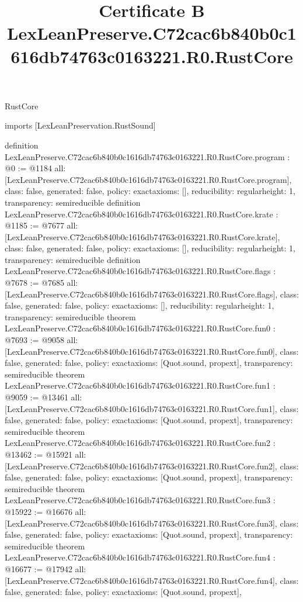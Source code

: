 \begin{lexlean}{RustCore}
\title{Certificate B LexLeanPreserve.C72cac6b840b0c1616db74763c0163221.R0.RustCore}
\begin{coremodule}
imports [LexLeanPreservation.RustSound]

definition LexLeanPreserve.C72cac6b840b0c1616db74763c0163221.R0.RustCore.program : @0 := @1184 {
  all: [LexLeanPreserve.C72cac6b840b0c1616db74763c0163221.R0.RustCore.program],
  class: false,
  generated: false,
  policy: exact{axioms: []},
  reducibility: regular{height: 1},
  transparency: semireducible
}
definition LexLeanPreserve.C72cac6b840b0c1616db74763c0163221.R0.RustCore.krate : @1185 := @7677 {
  all: [LexLeanPreserve.C72cac6b840b0c1616db74763c0163221.R0.RustCore.krate],
  class: false,
  generated: false,
  policy: exact{axioms: []},
  reducibility: regular{height: 1},
  transparency: semireducible
}
definition LexLeanPreserve.C72cac6b840b0c1616db74763c0163221.R0.RustCore.flags : @7678 := @7685 {
  all: [LexLeanPreserve.C72cac6b840b0c1616db74763c0163221.R0.RustCore.flags],
  class: false,
  generated: false,
  policy: exact{axioms: []},
  reducibility: regular{height: 1},
  transparency: semireducible
}
theorem LexLeanPreserve.C72cac6b840b0c1616db74763c0163221.R0.RustCore.fun0 : @7693 := @9058 {
  all: [LexLeanPreserve.C72cac6b840b0c1616db74763c0163221.R0.RustCore.fun0],
  class: false,
  generated: false,
  policy: exact{axioms: [Quot.sound, propext]},
  transparency: semireducible
}
theorem LexLeanPreserve.C72cac6b840b0c1616db74763c0163221.R0.RustCore.fun1 : @9059 := @13461 {
  all: [LexLeanPreserve.C72cac6b840b0c1616db74763c0163221.R0.RustCore.fun1],
  class: false,
  generated: false,
  policy: exact{axioms: [Quot.sound, propext]},
  transparency: semireducible
}
theorem LexLeanPreserve.C72cac6b840b0c1616db74763c0163221.R0.RustCore.fun2 : @13462 := @15921 {
  all: [LexLeanPreserve.C72cac6b840b0c1616db74763c0163221.R0.RustCore.fun2],
  class: false,
  generated: false,
  policy: exact{axioms: [Quot.sound, propext]},
  transparency: semireducible
}
theorem LexLeanPreserve.C72cac6b840b0c1616db74763c0163221.R0.RustCore.fun3 : @15922 := @16676 {
  all: [LexLeanPreserve.C72cac6b840b0c1616db74763c0163221.R0.RustCore.fun3],
  class: false,
  generated: false,
  policy: exact{axioms: [Quot.sound, propext]},
  transparency: semireducible
}
theorem LexLeanPreserve.C72cac6b840b0c1616db74763c0163221.R0.RustCore.fun4 : @16677 := @17942 {
  all: [LexLeanPreserve.C72cac6b840b0c1616db74763c0163221.R0.RustCore.fun4],
  class: false,
  generated: false,
  policy: exact{axioms: [Quot.sound, propext]},
}
\end{coremodule}
\end{lexlean}
